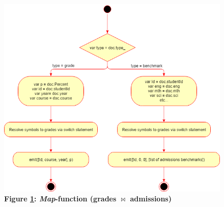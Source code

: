 \begin{figure}[H]
    \centering
    \begin{mdframed}
        \centering
        \includegraphics[scale=0.59]{./resources/figures/fig-mapfn-correlation-grades.png}
    \end{mdframed}
    \caption[\textit{Map}-function (\texorpdfstring{grades $\bowtie$ admissions}{Lg})]{\textbf{Figure \ref{fig-mapfn-correlation-grades}: \textit{Map}-function (\texorpdfstring{grades $\bowtie$ admissions}{Lg})}}
    \label{fig-mapfn-correlation-grades}
\end{figure}
